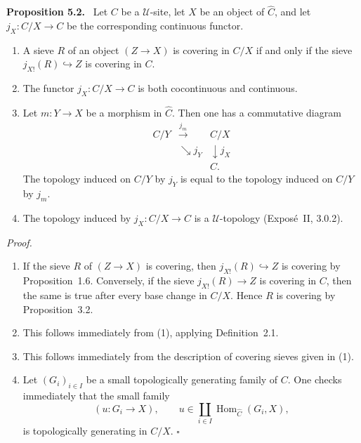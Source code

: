 \documentclass[11pt]{article}
\newcommand{\U}{\mathcal{U}}
\newcommand{\Hom}{\operatorname{Hom}}
\newcommand{\qedtext}{\hfill\(\square\)}
\newenvironment{statement}[1]{\par\medskip\noindent\textbf{#1.}\ }{\par\medskip}
\newenvironment{prooftext}{\par\noindent\emph{Proof.}\ }{\par\medskip}
\begin{document}
\begin{statement}{Proposition 5.2}
Let \(C\) be a \(\U\)-site, let \(X\) be an object of \(\widehat C\), and let \(j_X:C/X\to C\) be the corresponding continuous functor.
\begin{enumerate}[label=\arabic*)]
\item A sieve \(R\) of an object \((Z\to X)\) is covering in \(C/X\) if and only if the sieve \(j_{X!}(R)\hookrightarrow Z\) is covering in \(C\).
\item The functor \(j_X:C/X\to C\) is both cocontinuous and continuous.
\item Let \(m:Y\to X\) be a morphism in \(\widehat C\). Then one has a commutative diagram
\[
\begin{array}{ccc}
C/Y&\xrightarrow{j_m}&C/X\\
&\searrow j_Y&\downarrow j_X\\
&&C.
\end{array}
\]
The topology induced on \(C/Y\) by \(j_Y\) is equal to the topology induced on \(C/Y\) by \(j_m\).
\item The topology induced by \(j_X:C/X\to C\) is a \(\U\)-topology (Expos\'e~II, 3.0.2).
\end{enumerate}
\end{statement}

\begin{prooftext}
\begin{enumerate}[label=\arabic*)]
\item If the sieve \(R\) of \((Z\to X)\) is covering, then \(j_{X!}(R)\hookrightarrow Z\) is covering by Proposition~1.6. Conversely, if the sieve \(j_{X!}(R)\to Z\) is covering in \(C\), then the same is true after every base change in \(C/X\). Hence \(R\) is covering by Proposition~3.2.
\item This follows immediately from (1), applying Definition~2.1.
\item This follows immediately from the description of covering sieves given in (1).
\item Let \((G_i)_{i\in I}\) be a small topologically generating family of \(C\). One checks immediately that the small family
\[
(u:G_i\to X),
\qquad
u\in\coprod_{i\in I}\Hom_{\widehat C}(G_i,X),
\]
is topologically generating in \(C/X\). \qedtext
\end{enumerate}
\end{prooftext}
\end{document}
